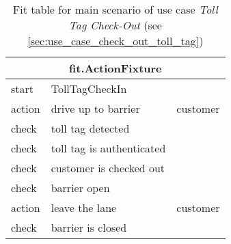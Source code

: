 
\begin{table}
\begin{centering}
\begin{tabular}{|l|l|l|}
\hline 
\multicolumn{3}{|c|}{fit.ActionFixture}\tabularnewline
\hline
start & TollTagCheckIn & \tabularnewline
\hline
action & drive up to barrier & customer \tabularnewline
\hline 
check & toll tag detected &\tabularnewline
\hline 
check & toll tag is authenticated & \tabularnewline
\hline 
check & customer is checked out & \tabularnewline
\hline 
check & barrier open & \tabularnewline
\hline 
action & leave the lane & customer \tabularnewline
\hline 
check & barrier is closed & \tabularnewline
\hline 
\end{tabular}
\par\end{centering}

\caption{Fit table for main scenario of use case \emph{Toll Tag Check-Out} (see \autoref{sec:use_case_check_out_toll_tag})}
\end{table}
